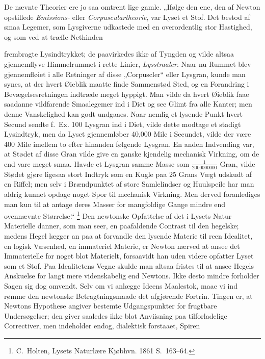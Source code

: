 \documentclass[12pt]{book}
\newcommand{\opage}[1]{\marginnote{\footnotesize\textit{[#1]}}}
\newcommand{\apage}[1]{\marginnote{\footnotesize\textit{[#1]}}}
\begin{document}
De nævnte Theorier ere jo saa omtrent lige gamle. „Ifølge den ene, den af Newton opstillede
\emph{Emissions-} eller \emph{Corpusculartheorie}, var Lyset et Stof. Det bestod af smaa
Legemer, som Lysgiverne udkastede med en overordentlig stor Hastighed, og som ved at træffe
Nethinden

\opage{376} frembragte Lysindtrykket; de paavirkedes ikke af Tyngden og vilde altsaa gjennemflyve
Himmelrummet i rette Linier, \emph{Lysstraaler}. Naar nu Rummet blev gjennemfløiet i alle
Retninger af disse „Corpuscler“ eller Lysgran, kunde man synes, at der hvert Øieblik maatte
finde Sammenstød Sted, og en Forandring i Bevægelsesretningen indtræde meget hyppigt. Man
vilde da hvert Øieblik faae saadanne vildfarende Smaalegemer ind i Diet og see Glimt fra
alle Kanter; men denne Vanskelighed kan godt undgaaes. Naar nemlig et lysende Punkt hvert
Secund sendte f.\ Ex. 100 Lysgran ind i Diet, vilde dette modtage et stadigt Lysindtryk,
men da Lyset gjennemløber 40{,}000 Mile i Secundet, vilde der være 400 Mile imellem to efter
hinanden følgende Lysgran. En anden Indvending var, at Stødet af disse Gran vilde give en
ganske kjendelig mechanisk Virkning, om de end vare meget smaa. Havde et Lysgran samme Masse
som $\frac{1}{2000000000}$ Gran, vilde Stødet gjøre ligesaa stort Indtryk som en Kugle paa
25 Grans Vægt udskudt af en Riffel; men selv i Brændpunktet af store Samlelindser og
Huulspeile har man aldrig kunnet opdage noget Spor til mechanisk Virkning. Men derved
foranlediges man kun til at antage deres Masser for mangfoldige Gange mindre end ovennævnte
Størrelse.“%
\footnote{C.\ Holten, Lysets Naturlære Kjøbhvn. 1861 S.~163--64.}
Den newtonske Opfattelse af det i Lysets Natur Materielle danner, som man seer, en
paafaldende Contrast til den hegelske; medens Hegel lægger an paa at forvandle den lysende
Materie til reen Idealitet, en logisk Væsenhed, en immateriel Materie, er Newton nærved at
ansee det Immaterielle for noget blot Materielt, forsaavidt han uden videre opfatter Lyset
som et Stof. Paa Idealitetens Vegne skulde man altsaa fristes til at ansee Hegels Anskuelse
for langt mere videnskabelig end Newtons. Ikke desto mindre forholder Sagen sig dog omvendt.
Selv om vi anlægge Ideens Maalestok, maae vi ind\-%
rømme \apage{377} den newtonske Betragtningsmaade det afgjørende Fortrin. Tingen er, at Newtons Hypothese
angiver bestemte Udgangspunkter for frugtbare Undersøgelser; den giver saaledes ikke blot
Anviisning paa tilforladelige Correctiver, men indeholder endog, dialektisk forstaaet, Spiren
\end{document}

